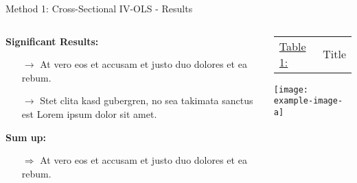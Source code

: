 \documentclass[compress, aspectratio=169, xcolor=dvipsnames]{beamer}
\begin{document}
\begin{frame}{Method 1: Cross-Sectional IV-OLS - Results}

\begin{columns}
	
\begin{column}{0.55\textwidth}
\textbf{Significant Results:}
\begin{itemize}
	\item[$\rightarrow$] At vero eos et accusam et justo duo dolores et ea rebum. 
	\item[$\rightarrow$] Stet clita kasd gubergren, no sea takimata sanctus est Lorem ipsum dolor sit amet.
\end{itemize}
\textbf{Sum up:}
\begin{itemize}
	\item[$\Rightarrow$] At vero eos et accusam et justo duo dolores et ea rebum. 
\end{itemize}


\end{column}

\begin{column}{0.4\textwidth}
	\begin{center}
	\scriptsize{
	\begin{tabular}{l p{4cm}}
 	\underline{Table 1:} & Title 
 	\end{tabular}}
    \texttt{[image: example-image-a]}\qquad
    \end{center}
\end{column}
	
\end{columns}
	
\end{frame}

\end{document}
